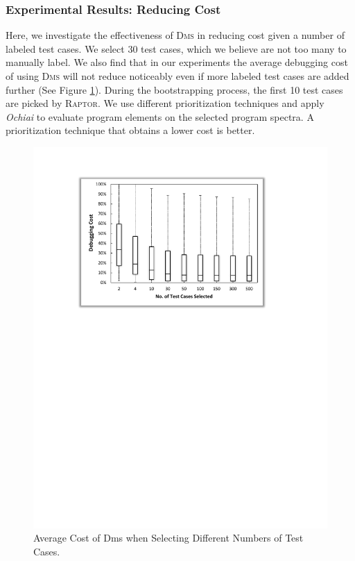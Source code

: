 \subsubsection{Experimental Results: Reducing Cost}\label{sec.exp.resultsB}

Here, we investigate the effectiveness of \textsc{Dms} in reducing cost given a number of labeled test cases. We select 30 test cases, which we believe are not too many to manually label. We also find that in our experiments the average debugging cost of using \textsc{Dms} will not reduce noticeably even if more labeled test cases are added further (See Figure \ref{Dms_boxplot}). During the bootstrapping process, the first 10 test cases are picked by \textsc{Raptor}. We use different prioritization techniques and apply {\em Ochiai} to evaluate program elements on the selected program spectra. A prioritization technique that obtains a lower cost is better.

\begin{figure}[!htbp]
    \centering
    \includegraphics[width=12cm]{sdm_boxplot.pdf}
    \caption{Average Cost of {\sc Dms} when Selecting Different Numbers of Test Cases.}
    \label{Dms_boxplot}
\end{figure}

